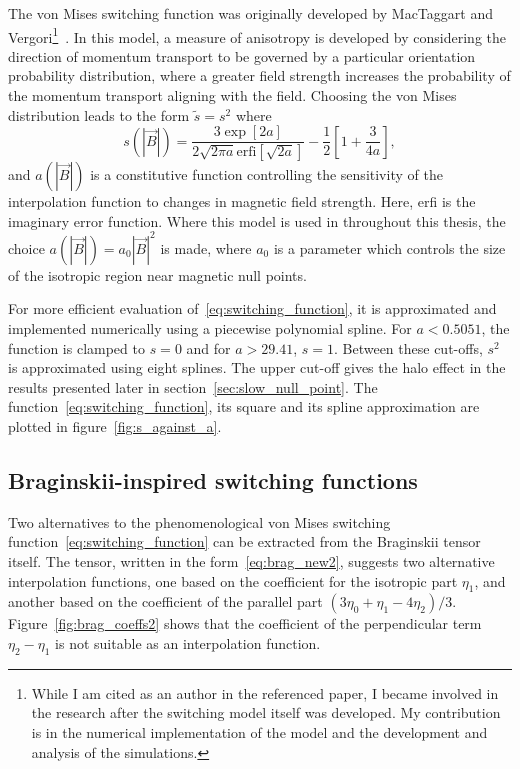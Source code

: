 The von Mises switching function was originally developed by MacTaggart and Vergori\footnote{While I am cited as an author in the referenced paper, I became involved in the research after the switching model itself was developed. My contribution is in the numerical implementation of the model and the development and analysis of the simulations.}~\cite{mactaggartBraginskiiMagnetohydrodynamicsArbitrary2017}. In this model, a measure of anisotropy is developed by considering the direction of momentum transport to be governed by a particular orientation probability distribution, where a greater field strength increases the probability of the momentum transport aligning with the field. Choosing the von Mises distribution leads to the form $\tilde{s} = s^2$ where
\begin{equation}
  \label{eq:switching_function}
s(|\vec{B}|) = \frac{3 \exp[2a]}{2\sqrt{2\pi a} \text{erfi}[\sqrt{2a}]} - \frac{1}{2}\left[ 1 + \frac{3}{4a} \right],
\end{equation}
and $a(|\vec{B}|)$ is a constitutive function controlling the sensitivity of the interpolation function to changes in magnetic field strength. Here, erfi is the imaginary error function. Where this model is used in throughout this thesis, the choice $a(|\vec{B}|) = a_0 |\vec{B}|^2$ is made, where $a_0$ is a parameter which controls the size of the isotropic region near magnetic null points. 

For more efficient evaluation of~\eqref{eq:switching_function}, it is approximated and implemented numerically using a piecewise polynomial spline. For $a < 0.5051$, the function is clamped to $s=0$ and for $a > 29.41$, $s=1$. Between these cut-offs, $s^2$ is approximated using eight splines. The upper cut-off gives the halo effect in the results presented later in section~\ref{sec:slow_null_point}. The function~\eqref{eq:switching_function}, its square and its spline approximation are plotted in figure~\ref{fig:s_against_a}. 

\subsection{Braginskii-inspired switching functions}

Two alternatives to the phenomenological von Mises switching function~\eqref{eq:switching_function} can be extracted from the Braginskii tensor itself. The tensor, written in the form~\eqref{eq:brag_new2}, suggests two alternative interpolation functions, one based on the coefficient for the isotropic part $\eta_1$, and another based on the coefficient of the parallel part $(3\eta_0+\eta_1-4\eta_2)/3$. Figure~\ref{fig:brag_coeffs2} shows that the coefficient of the perpendicular term $\eta_2 - \eta_1$ is not suitable as an interpolation function.

